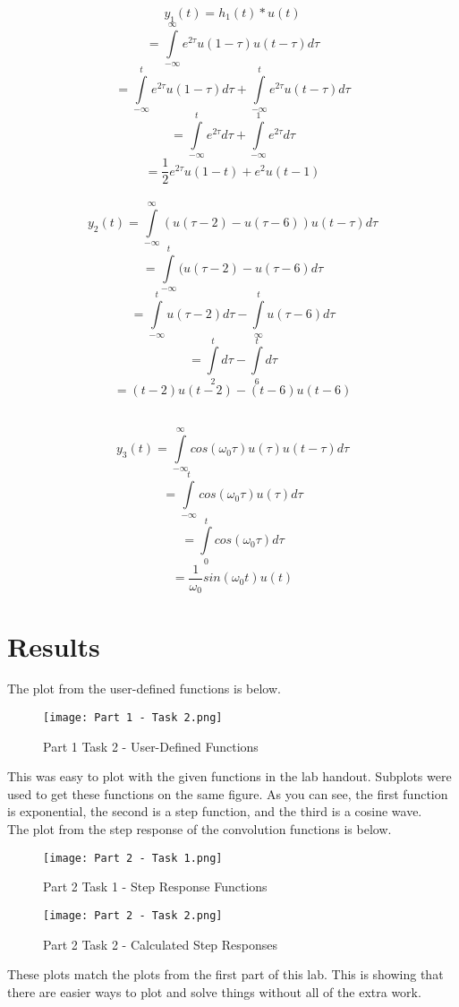 \documentclass[12pt]{report}
\begin{document}
\[y_1(t)=h_1(t)*u(t)\]
\[=\int\limits_{-\infty}^\infty e^{2\tau} u(1-\tau) u(t-\tau)d\tau\]
\[=\int\limits_{-\infty}^t e^{2\tau} u(1-\tau)d\tau + \int\limits_{-\infty}^t e^{2\tau} u(t-\tau)d\tau\]
\[=\int\limits_{-\infty}^t e^{2\tau} d\tau + \int\limits_{-\infty}^1 e^{2\tau} d\tau\]
\[= \frac{1}{2} e^{2\tau} u(1-t) + e^2 u(t-1) \] \\

\[y_2(t)=\int\limits_{-\infty}^\infty (u(\tau -2) - u(\tau -6))u(t-\tau)d\tau\]
\[=\int\limits_{-\infty}^t (u(\tau -2)-u(\tau -6)d\tau \]
\[=\int\limits_{-\infty}^t u(\tau -2)d\tau - \int\limits_{\infty}^t u(\tau -6)d\tau \]
\[=\int\limits_{2}^t d\tau - \int\limits_{6}^t d\tau \]
\[=(t-2)u(t-2) - (t-6)u(t-6)\] \\

\clearpage 

\[y_3(t)=\int\limits_{-\infty}^\infty cos(\omega_0 \tau ) u(\tau)u(t-\tau)d\tau\]
\[=\int\limits_{-\infty}^t cos(\omega_0 \tau )u(\tau)d\tau\]
\[=\int\limits_{0}^t cos(\omega_0 \tau )d\tau\]
\[= \frac{1}{\omega_0}sin(\omega_0 t)u(t)\]

\section{Results}
The plot from the user-defined functions is below.
\begin{figure}[ht]
\begin{center}
\texttt{[image: Part 1 - Task 2.png]}
\caption{Part 1 Task 2 - User-Defined Functions}
\end{center}
\end{figure}

\noindent This was easy to plot with the given functions in the lab handout. Subplots were used to get these functions on the same figure. As you can see, the first function is exponential, the second is a step function, and the third is a cosine wave. \\

\noindent The plot from the step response of the convolution functions is below.

\begin{figure}[ht]
\begin{center}
\texttt{[image: Part 2 - Task 1.png]}
\caption{Part 2 Task 1 - Step Response Functions}
\end{center}
\end{figure}

\begin{figure}[ht]
\begin{center}
\texttt{[image: Part 2 - Task 2.png]}
\caption{Part 2 Task 2 - Calculated Step Responses}
\end{center}
\end{figure}
\noindent These plots match the plots from the first part of this lab. This is showing that there are easier ways to plot and solve things without all of the extra work. 
\end{document}
